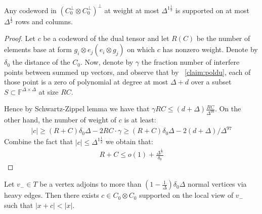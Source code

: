 \begin{claim}
  \label{claim:lim}
  Any codeword in $\left( C_{0}^{\perp} \otimes C_{0}^{\perp} \right)^{\perp}$ at weight at most $\Delta^{1 \frac{1}{2}}$ is supported on at most $\Delta^{\frac{1}{2}} $ rows and columns.
\end{claim}
\begin{proof}
  Let $c$ be a codeword of the dual tensor and let $R (C)$ be the number of elements base at form $g_{i}\otimes e_{j} (e_{i} \otimes g_{j})$ on which $c$ has nonzero weight. Denote by $\delta_{0}$ the distance of the $C_{0}$. Now, denote by $\gamma$ the fraction number of interfere points between summed up vectors, and observe that by ~\cref{claim:poldu}, each of those point is a zero of polynomial at degree at most $\Delta + d$ over a subset $S \subset \mathbb{F}^{\Delta\times \Delta} $ at size $RC$.     

  Hence by Schwartz-Zippel lemma \cite{Schwartz} we have that $\gamma RC \le \left( d + \Delta \right) \frac{RC}{\Delta^{99}} $. On the other hand, the number of weight of $c$ is at least: 
\begin{equation*}
    \begin{split}
      |c| \ge \left( R + C  \right) \delta_{0}\Delta - 2 RC \cdot \gamma  \ge \left( R + C \right)\delta_{0}\Delta -2 \left( d + \Delta  \right) / \Delta^{97}
    \end{split}
  \end{equation*}
  Combine the fact that $|c| \le \Delta^{1 \frac{1}{2}}$ we obtain that: 
  \begin{equation*}
    \begin{split}
      R + C \le o(1) + \frac{\Delta^{\frac{1}{2}}}{\delta_{0}}
    \end{split}
  \end{equation*}
\end{proof}
  
\begin{claim}
  Let $v_{-} \in T$ be a vertex adjoins to more than $\left( 1 - \frac{1}{\Delta} \right)\delta_{0}\Delta$ normal vertices via heavy edges. Then there exists $c \in C_{0} \otimes C_{0}$ supported on the local view of $v_{-}$ such that $|x + c| < |x|$. 
\end{claim}

